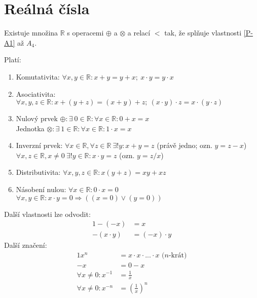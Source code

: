 \section{Reálná čísla}

\begin{theoremAlph}
	Existuje množina $\mathbb{R}$ s operacemi $\oplus$ a $\otimes$ a relací $<$ tak,
	že splňuje vlastnosti \ref{P-A1} až \textit{$A_4$}.	%
\end{theoremAlph}

\begin{property}\label{P-A1}
	Platí:

	\begin{enumerate}[I]
		\item Komutativita: $\forall x, y \in \mathbb{R}: x + y = y + x;~x\cdot y = y\cdot x$
		\item Asociativita: $\forall x, y, z \in \mathbb{R}: x + (y + z) = (x + y) + z;
			~(x\cdot y)\cdot z = x\cdot (y\cdot z)$
		\item Nulový prvek $\oplus: \exists~0 \in \mathbb{R}: \forall x \in \mathbb{R}: 0 + x = x$ \\
			Jednotka $\otimes: \exists~1 \in \mathbb{R}: \forall x \in \mathbb{R}: 1 \cdot x = x$
		\item Inverzní prvek: $\forall x \in \mathbb{R}, \forall z \in \mathbb{R}~\exists ! y:
			x + y = z$ (právě jedno; ozn. $y = z - x$) \\
			$\forall x, z \in \mathbb{R}, x\neq0 ~\exists ! y \in \mathbb{R}:
			x \cdot y = z$ (ozn. $y = z / x$)
		\item Distributivita: $\forall x, y, z \in \mathbb{R}: x (y + z) = xy + xz$
		\item Násobení nulou: $\forall x \in \mathbb{R}: 0\cdot x = 0$ \\
			$\forall x, y \in \mathbb{R}: x\cdot y = 0 \Rightarrow ((x = 0) \lor (y = 0))$
	\end{enumerate}
\end{property}
Další vlastnosti lze odvodit:
\begin{alignat}{1}
	-(-x) &= x \\
	-(x\cdot y) &= (-x)\cdot y
\end{alignat}
Další značení:
\begin{alignat}{1}
	x^n &= x\cdot x\cdot \text{...} \cdot x \text{~($n$-krát)} \\
	-x &= 0 - x \\
	\forall x \neq 0: x^{-1} &= \frac{1}{x} \\
	\forall x \neq 0: x^{-n} &= \left( \frac{1}{x} \right)^n
\end{alignat}

